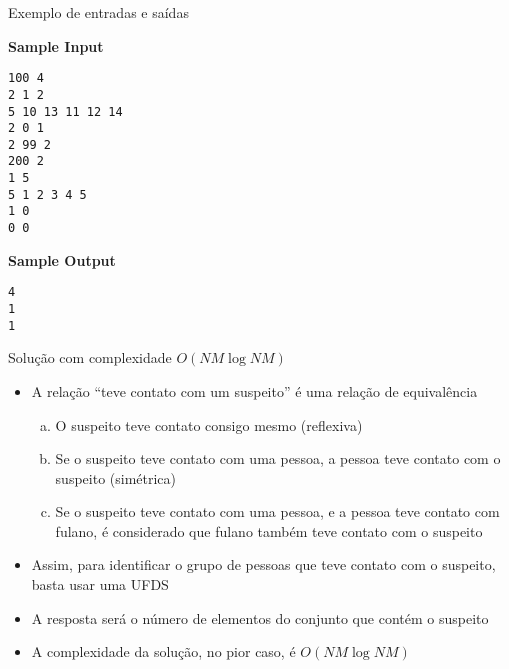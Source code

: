 \begin{frame}[fragile]{Exemplo de entradas e saídas}

\begin{footnotesize}
\begin{minipage}[t]{0.6\textwidth}
\textbf{Sample Input}
\begin{verbatim}
100 4
2 1 2
5 10 13 11 12 14
2 0 1
2 99 2
200 2
1 5
5 1 2 3 4 5
1 0
0 0
\end{verbatim}
\end{minipage}
\begin{minipage}[t]{0.35\textwidth}
\textbf{Sample Output}
\begin{verbatim}
4
1
1
\end{verbatim}
\end{minipage}
\end{footnotesize}

\end{frame}

\begin{frame}[fragile]{Solução com complexidade $O(NM\log NM)$}

    \begin{itemize}
        \item A relação ``teve contato com um suspeito'' é uma relação de equivalência
            \begin{enumerate}[(a)]
                \item O suspeito teve contato consigo mesmo (reflexiva)
                \item Se o suspeito teve contato com uma pessoa, a pessoa teve contato com o 
                    suspeito (simétrica)
                \item Se o suspeito teve contato com uma pessoa, e a pessoa teve contato com 
                    fulano, é considerado que fulano também teve contato com o suspeito
            \end{enumerate}

        \item Assim, para identificar o grupo de pessoas que teve contato com o suspeito,
            basta usar uma UFDS

        \item A resposta será o número de elementos do conjunto que contém o suspeito

        \item A complexidade da solução, no pior caso, é $O(NM\log NM)$

   \end{itemize}

\end{frame}


